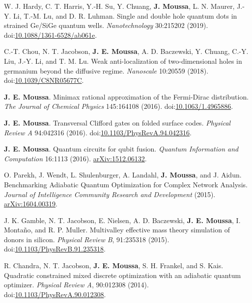\documentclass[10pt]{article}
\makeatletter
\newlength{\bibhang}
\newlength{\bibsep}
 {\@listi \global\bibsep\itemsep \global\advance\bibsep by\parsep}
\newenvironment{bibsection}%
        {\vspace{-1.6\baselineskip}\begin{etaremune}[leftmargin=1.6em]{%
       \setlength{\leftmargin}{\bibhang}%
       \setlength{\itemindent}{-\leftmargin}%
       \setlength{\itemsep}{\bibsep}%
       \setlength{\parsep}{\z@}%
        \setlength{\partopsep}{0pt}%
        \setlength{\topsep}{0pt}}}
        {\end{etaremune}\vspace{-.6\baselineskip}}
\newcommand\doilink[1]{\href{http://dx.doi.org/#1}{#1}}
\newcommand\doi[1]{doi:\doilink{#1}}
\makeatother
\begin{document}
\begin{bibsection}
    \item W. J. Hardy, C. T. Harris, Y.-H. Su, Y. Chuang, \textbf{J. Moussa}, L. N. Maurer, J.-Y. Li, T.-M. Lu, and D. R. Luhman. Single and double hole quantum dots in strained Ge/SiGe quantum wells.
    \emph{Nanotechnology} 30:215202 (2019). \doi{10.1088/1361-6528/ab061e}.

    \item C.-T. Chou,  N. T. Jacobson, \textbf{J. E. Moussa},  A. D. Baczewski,  Y. Chuang, C.-Y. Liu,  J.-Y. Li, and T. M. Lu. Weak anti-localization of two-dimensional holes in germanium beyond the diffusive regime.
    \emph{Nanoscale} 10:20559 (2018). \doi{10.1039/C8NR05677C}.

    \item \textbf{J. E. Moussa}. Minimax rational approximation of the Fermi-Dirac distribution.
    \emph{The Journal of  Chemical Physics} 145:164108 (2016). \doi{10.1063/1.4965886}.

    \item \textbf{J. E. Moussa}. Transversal Clifford gates on folded surface codes.
    \emph{Physical Review A} 94:042316 (2016). \doi{10.1103/PhysRevA.94.042316}.

    \item \textbf{J. E. Moussa}. Quantum circuits for qubit fusion.
    \emph{Quantum Information and Computation} 16:1113 (2016). \href{https://arxiv.org/abs/1512.06132}{arXiv:1512.06132}.

    \item O. Parekh, J. Wendt, L. Shulenburger, A. Landahl, \textbf{J. Moussa}, and J. Aidun. Benchmarking Adiabatic Quantum Optimization for Complex Network Analysis.
    \emph{Journal of Intelligence Community Research and Development} (2015). \\ \href{https://arxiv.org/abs/1604.00319}{arXiv:1604.00319}.

    \item J. K. Gamble, N. T. Jacobson, E. Nielsen, A. D. Baczewski, \textbf{J. E. Moussa}, I. Monta\~{n}o, and R. P. Muller. Multivalley effective mass theory simulation of donors in silicon.
     \emph{Physical Review B}, 91:235318 (2015). \doi{10.1103/PhysRevB.91.235318}.

    \item R. Chandra, N. T. Jacobson, \textbf{J. E. Moussa}, S. H. Frankel, and S. Kais. Quadratic constrained mixed discrete optimization with an adiabatic quantum optimizer.
     \emph{Physical Review A}, 90:012308 (2014). \doi{10.1103/PhysRevA.90.012308}.


\end{bibsection}
\end{document}
